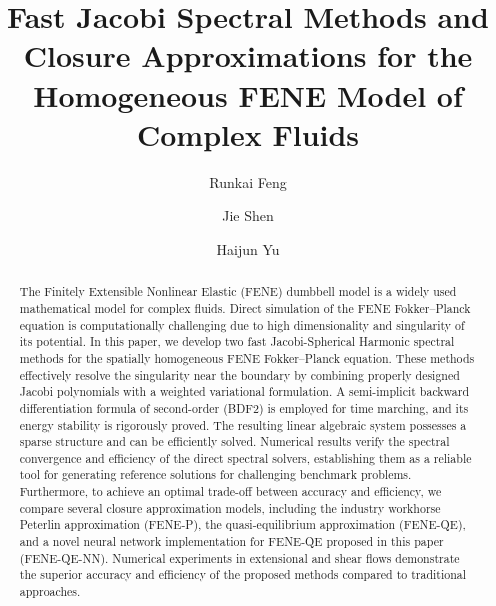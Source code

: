 \documentclass[preprint,12pt]{elsarticle}
\begin{document}
\begin{frontmatter}

\title{Fast Jacobi Spectral Methods and Closure Approximations for the Homogeneous FENE Model of Complex Fluids}


            

\author[inst2,inst1]{Runkai Feng}

\author[inst3]{Jie Shen}

\author[inst1,inst2]{Haijun Yu}


\begin{abstract}
The Finitely Extensible Nonlinear Elastic (FENE) dumbbell model is a widely used mathematical model for complex fluids.
Direct simulation of the FENE Fokker--Planck equation is computationally challenging due to high dimensionality and singularity of its potential. In this paper, we develop two fast Jacobi-Spherical Harmonic spectral methods for the spatially homogeneous FENE Fokker--Planck equation. These methods effectively resolve the singularity near the boundary by combining properly designed Jacobi polynomials with a weighted variational formulation. A semi-implicit backward differentiation formula of second-order (BDF2) is employed for time marching, and its energy stability is rigorously proved. The resulting linear algebraic system possesses a sparse structure and can be efficiently solved. Numerical results verify the spectral convergence and efficiency of the direct spectral solvers, establishing them as a reliable tool for generating reference solutions for challenging benchmark problems. Furthermore, to achieve an optimal trade-off between accuracy and efficiency, we compare several closure approximation models, including the industry workhorse Peterlin approximation (FENE-P), the quasi-equilibrium approximation (FENE-QE), and a novel neural network implementation for FENE-QE proposed in this paper (FENE-QE-NN). Numerical experiments in extensional and shear flows demonstrate the superior accuracy and efficiency of the proposed methods compared to traditional approaches.
\end{abstract}


\end{frontmatter}
\end{document}
